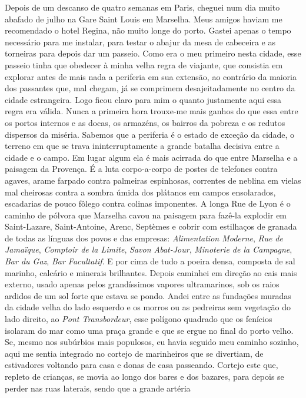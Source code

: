 Depois de um descanso de quatro semanas em Paris, cheguei num dia muito
abafado de julho na Gare Saint Louis em Marselha. Meus amigos haviam me
recomendado o hotel Regina, não muito longe do porto. Gastei apenas o
tempo necessário para me instalar, para testar o abajur da mesa de
cabeceira e as torneiras para depois dar um passeio. Como era o meu
primeiro nesta cidade, esse passeio tinha que obedecer à minha velha
regra de viajante, que consistia em explorar antes de mais nada a
periferia em sua extensão, ao contrário da maioria dos passantes que,
mal chegam, já se comprimem desajeitadamente no centro da cidade
estrangeira. Logo ficou claro para mim o quanto justamente aqui essa
regra era válida. Nunca a primeira hora trouxe-me mais ganhos do que
essa entre os portos internos e as docas, os armazéns, os bairros da
pobreza e os redutos dispersos da miséria. Sabemos que a periferia é o
estado de exceção da cidade, o terreno em que se trava ininterruptamente
a grande batalha decisiva entre a cidade e o campo. Em lugar algum ela é
mais acirrada do que entre Marselha e a paisagem da Provença. É a luta
corpo-a-corpo de postes de telefones contra agaves, arame farpado contra
palmeiras espinhosas, correntes de neblina em vielas mal cheirosas
contra a sombra úmida dos plátanos em campos ensolarados, escadarias de
pouco fôlego contra colinas imponentes. A longa Rue de Lyon é o caminho
de pólvora que Marselha cavou na paisagem para fazê-la explodir em
Saint-Lazare, Saint-Antoine, Arenc, Septèmes e cobrir com estilhaços de
granada de todas as línguas dos povos e das empresas: \emph{Alimentation
Moderne}, \emph{Rue de Jamaïque}, \emph{Comptoir de la Limite},
\emph{Savon Abat-Jour}, \emph{Minoterie de la Campagne}, \emph{Bar du
Gaz}, \emph{Bar Facultatif}. E por cima de tudo a poeira densa, composta
de sal marinho, calcário e minerais brilhantes. Depois caminhei em
direção ao cais mais externo, usado apenas pelos grandíssimos vapores
ultramarinos, sob os raios ardidos de um sol forte que estava se pondo.
Andei entre as fundações muradas da cidade velha do lado esquerdo e os
morros ou as pedreiras sem vegetação do lado direito, ao \emph{Pont
Transbordeur}, esse polígono quadrado que os fenícios isolaram do mar
como uma praça grande e que se ergue no final do porto velho. Se, mesmo
nos subúrbios mais populosos, eu havia seguido meu caminho sozinho, aqui
me sentia integrado no cortejo de marinheiros que se divertiam, de
estivadores voltando para casa e donas de casa passeando. Cortejo este
que, repleto de crianças, se movia ao longo dos bares e dos bazares,
para depois se perder nas ruas laterais, sendo que a grande artéria
